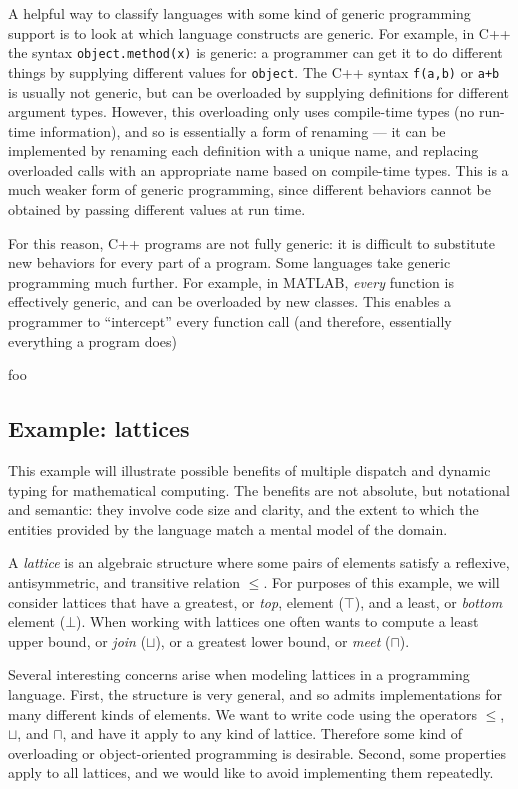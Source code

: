 A helpful way to classify languages with some kind of generic programming
support is to look at which language constructs are generic. For example,
in C++ the syntax \texttt{object.method(x)} is generic: a programmer can
get it to do different things by supplying different values for
\texttt{object}. The C++ syntax \texttt{f(a,b)} or \texttt{a+b} is
usually not generic, but can be overloaded by supplying definitions for
different argument types. However, this overloading only uses compile-time
types (no run-time information), and so is essentially a form of renaming ---
it can be implemented by renaming each definition with a unique name, and
replacing overloaded calls with an appropriate name based on compile-time
types. This is a much weaker form of generic programming, since different
behaviors cannot be obtained by passing different values at run time.

For this reason, C++ programs are not fully generic: it is difficult to
substitute new behaviors for every part of a program. Some languages
take generic programming much further. For example, in MATLAB, \emph{every}
function is effectively generic, and can be overloaded by new classes.
This enables a programmer to ``intercept'' every function call (and therefore,
essentially everything a program does)

foo

\subsection{Example: lattices}

This example will illustrate possible benefits of multiple dispatch and
dynamic typing for mathematical computing.
The benefits are not absolute, but notational and semantic:
they involve code size and clarity, and the extent to which the entities
provided by the language match a mental model of the domain.

A \emph{lattice} is an algebraic structure where some pairs of elements
satisfy a reflexive, antisymmetric, and transitive relation $\leq$.
For purposes of this example, we will consider lattices that have
a greatest, or \emph{top}, element ($\top$), and a least, or \emph{bottom}
element ($\bot$). When working with lattices one often wants to compute
a least upper bound, or \emph{join} ($\sqcup$), or a greatest lower bound,
or \emph{meet} ($\sqcap$).

Several interesting concerns arise when modeling lattices in a programming
language. First, the structure is very general, and so admits implementations
for many different kinds of elements. We want to write code using
the operators $\leq$, $\sqcup$, and $\sqcap$, and have it apply to any kind
of lattice. Therefore some kind of overloading or object-oriented programming
is desirable. Second, some properties apply to all lattices, and we would
like to avoid implementing them repeatedly.


